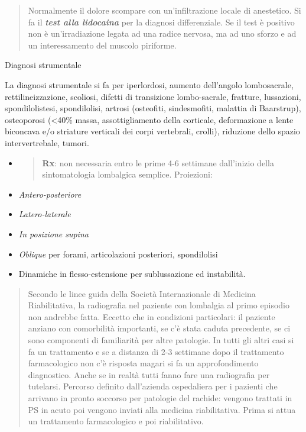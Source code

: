 \documentclass[]{article}
\begin{document}
\begin{quote}
Normalmente il dolore scompare con un'infiltrazione locale di
anestetico. Si fa il \emph{\textbf{\emph{test alla lidocaina}}} per la
diagnosi differenziale. Se il test è positivo non è un'irradiazione
legata ad una radice nervosa, ma ad uno sforzo e ad un interessamento
del muscolo piriforme.
\end{quote}

Diagnosi strumentale

La diagnosi strumentale si fa per iperlordosi, aumento dell'angolo
lombosacrale, rettilineizzazione, scoliosi, difetti di transizione
lombo-sacrale, fratture, lussazioni, spondilolistesi, spondilolisi,
artrosi (osteofiti, sindesmofiti, malattia di Baarstrup), osteoporosi
(\textless{}40\% massa, assottigliamento della corticale, deformazione a
lente biconcava e/o striature verticali dei corpi vertebrali, crolli),
riduzione dello spazio intervertrebale, tumori.

\begin{itemize}
\item
  \begin{quote}
  \textbf{Rx}: non necessaria entro le prime 4-6 settimane dall'inizio
  della sintomatologia lombalgica semplice. Proiezioni:
  \end{quote}
\end{itemize}

\begin{itemize}
\item
  \emph{Antero-posteriore}
\item
  \emph{Latero-laterale}
\item
  \emph{In posizione supina}
\item
  \emph{Oblique} per forami, articolazioni posteriori, spondilolisi
\item
  Dinamiche in flesso-estensione per sublussazione ed instabilità.
\end{itemize}

\begin{quote}
Secondo le linee guida della Società Internazionale di Medicina
Riabilitativa, la radiografia nel paziente con lombalgia al primo
episodio non andrebbe fatta. Eccetto che in condizioni particolari: il
paziente anziano con comorbilità importanti, se c'è stata caduta
precedente, se ci sono componenti di familiarità per altre patologie. In
tutti gli altri casi si fa un trattamento e se a distanza di 2-3
settimane dopo il trattamento farmacologico non c'è risposta magari si
fa un approfondimento diagnostico. Anche se in realtà tutti fanno fare
una radiografia per tutelarsi. Percorso definito dall'azienda
ospedaliera per i pazienti che arrivano in pronto soccorso per patologie
del rachide: vengono trattati in PS in acuto poi vengono inviati alla
medicina riabilitativa. Prima si attua un trattamento farmacologico e
poi riabilitativo.
\end{quote}
\end{document}
